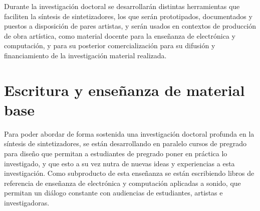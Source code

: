 \documentclass[../proyecto.tex]{subfiles}
\begin{document}
Durante la investigación doctoral se desarrollarán distintas herramientas que faciliten la síntesis de sintetizadores, los que serán prototipados, documentados y puestos a disposición de pares artistas, y serán usados en contextos de producción de obra artística, como material docente para la enseñanza de electrónica y computación, y para su posterior comercialización para su difusión y financiamiento de la investigación material realizada.

\section{Escritura y enseñanza de material base}

Para poder abordar de forma sostenida una investigación doctoral profunda en la síntesis de sintetizadores, se están desarrollando en paralelo cursos de pregrado para diseño que permitan a estudiantes de pregrado poner en práctica lo investigado, y que esto a su vez nutra de nuevas ideas y experiencias a esta investigación. Como subproducto de esta enseñanza se están escribiendo libros de referencia de enseñanza de electrónica y computación aplicadas a sonido, que permitan un diálogo constante con audiencias de estudiantes, artistas e investigadoras.
\end{document}
